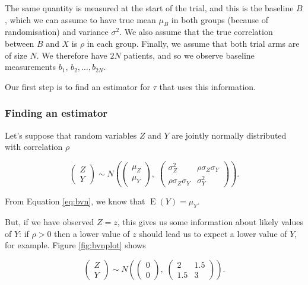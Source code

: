 \documentclass[
  openany]{book}
\theoremstyle{definition}
\theoremstyle{definition}
\theoremstyle{definition}
\theoremstyle{definition}
\theoremstyle{remark}
\begin{document}
The same quantity is measured at the start of the trial, and this is the baseline \(B\), which we can assume to have true mean \(\mu_B\) in both groups (because of randomisation) and variance \(\sigma^2\). We also assume that the true correlation between \(B\) and \(X\) is \(\rho\) in each group. Finally, we assume that both trial arms are of size \(N\). We therefore have \(2N\) patients, and so we observe baseline measurements \(b_1,\,b_2,\ldots,b_{2N}\).

Our first step is to find an estimator for \(\tau\) that uses this information.

\subsubsection{Finding an estimator}\label{finding-an-estimator}

Let's suppose that random variables \(Z\) and \(Y\) are jointly normally distributed with correlation \(\rho\)

\begin{equation}
\begin{pmatrix}
Z\\
Y
\end{pmatrix} \sim N\left(
\begin{pmatrix}
\mu_Z\\
\mu_Y
\end{pmatrix},\;
\begin{pmatrix}
\sigma^2_Z & \rho\sigma_Z\sigma_Y \\
\rho\sigma_Z\sigma_Y & \sigma^2_Y
\end{pmatrix}
\right).
\label{eq:bvn}
\end{equation}

From Equation \eqref{eq:bvn}, we know that \(\operatorname{E}\left(Y\right) = \mu_Y\).

But, if we have observed \(Z=z\), this gives us some information about likely values of \(Y\): if \(\rho>0\) then a lower value of \(z\) should lead us to expect a lower value of \(Y\), for example. Figure \ref{fig:bvnplot} shows

\begin{equation}
\begin{pmatrix}
Z\\
Y
\end{pmatrix} \sim N\left(
\begin{pmatrix}
0\\
0
\end{pmatrix},\;
\begin{pmatrix}
2 & 1.5 \\
1.5 & 3
\end{pmatrix}
\right).
\label{eq:bvneg}
\end{equation}
\end{document}
